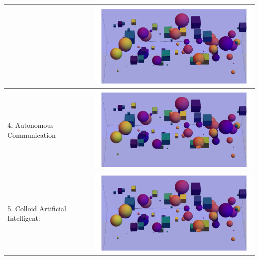 \begin{table}[h!]
\begin{tabular}{ | m{6cm} | m{6cm} | }
      
      &
      \begin{minipage}{.3\textwidth}
      \includegraphics[width=\linewidth]{figures/table1_1.pdf}
    \end{minipage}
    \\ \hline
      4. Autonomous Communication
    
      &
      \begin{minipage}{.3\textwidth}
      \includegraphics[width=\linewidth]{figures/table1_1.pdf}
    \end{minipage}
    \\ \hline
      5. Colloid Artificial Intelligent: 
  
      &
      \begin{minipage}{.3\textwidth}
      \includegraphics[width=\linewidth]{figures/table1_1.pdf}
    \end{minipage}
    \\ \hline
    

\end{tabular}
\end{table}
